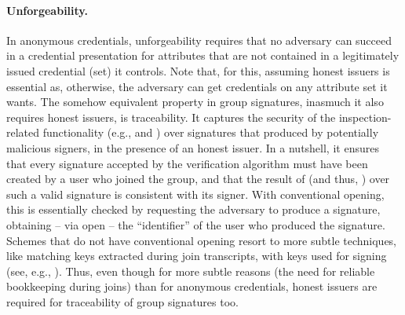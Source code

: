 \paragraph{Unforgeability.} In anonymous credentials, unforgeability requires
that no adversary can succeed in a credential presentation for attributes that
are not contained in a legitimately issued credential (set) it controls. Note
that, for this, assuming honest issuers is essential as, otherwise, the
adversary can get credentials on any attribute set it wants.
%
The somehow equivalent property in group signatures, inasmuch it also requires
honest issuers, is traceability. It captures the security of the
inspection-related functionality (e.g., \Inspect and \Judge) over signatures
that produced by potentially malicious signers, in the presence of an honest
issuer. In a nutshell, it ensures that every signature accepted by
the verification algorithm must have been created by a user who joined the
group, and that the result of \Inspect (and thus, \Judge) over such a valid
signature is consistent with its signer. With conventional opening, this is
essentially checked by requesting the adversary to produce a signature,
obtaining -- via open -- the ``identifier'' of the user who produced the
signature. Schemes
that do not have conventional opening resort to more subtle techniques, like
matching keys extracted during join transcripts, with keys used for signing
(see, e.g., \cite{dl21}). Thus, even though for more subtle reasons (the need
for reliable bookkeeping during joins) than for anonymous credentials, honest
issuers are required for traceability of group signatures too.

